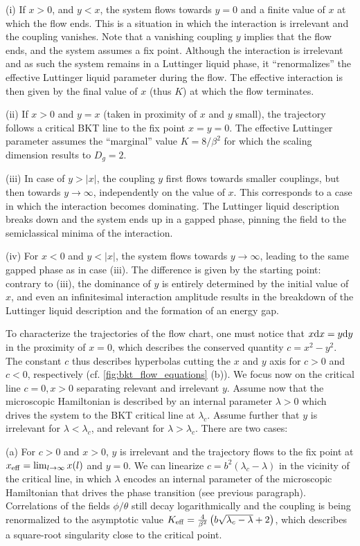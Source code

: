 (i) If $x>0$, and $y<x$, the system flows towards $y=0$ and a finite value of $x$ at which the flow ends.
This is a situation in which the interaction is irrelevant and the coupling vanishes.
Note that a vanishing coupling $y$ implies that the flow ends, and the system assumes a fix point.
Although the interaction is irrelevant and as such the system remains in a Luttinger liquid phase, it ``renormalizes'' the effective Luttinger liquid parameter during the flow.
The effective interaction is then given by the final value of $x$ (thus $K$) at which the flow terminates.

(ii) If $x>0$ and $y=x$ (taken in proximity of $x$ and $y$ small), the trajectory follows a critical BKT line to the fix point $x=y=0$.
The effective Luttinger parameter assumes the ``marginal'' value $K=8/\beta^2$ for which the scaling dimension results to $D_g=2$.

(iii) In case of $y>|x|$, the coupling $y$ first flows towards smaller couplings, but then towards $y\rightarrow\infty$, independently on the value of $x$.
This corresponds to a case in which the interaction becomes dominating.
The Luttinger liquid description breaks down and the system ends up in a gapped phase, pinning the field to the semiclassical minima of the interaction.

(iv) For $x<0$ and $y<|x|$, the system flows towards $y\rightarrow\infty$, leading to the same gapped phase as in case (iii).
The difference is given by the starting point: contrary to (iii), the dominance of $y$ is entirely determined by the initial value of $x$, and even an infinitesimal interaction amplitude results in the breakdown of the Luttinger liquid description and the formation of an energy gap.

To characterize the trajectories of the flow chart, one must notice that $x\mathrm d x = y\mathrm d y$ in the proximity of $x=0$, which describes the conserved quantity $c = x^2-y^2$.
The constant $c$ thus describes hyperbolas cutting the $x$ and $y$ axis for $c>0$ and $c<0$, respectively (cf. \cref{fig:bkt_flow_equations} (b)).
We focus now on the critical line $c=0, x>0$ separating relevant and irrelevant $y$.
Assume now that the microscopic Hamiltonian is described by an internal parameter $\lambda>0$ which drives the system to the BKT critical line at $\lambda_c$.
Assume further that $y$ is irrelevant for $\lambda<\lambda_c$, and relevant for $\lambda>\lambda_c$.
There are two cases:

(a) For $c>0$ and $x>0$, $y$ is irrelevant and the trajectory flows to the fix point at $x_{\rm eff} = \lim_{l\rightarrow\infty} x(l)$ and $y=0$.
We can linearize $c=b^2(\lambda_c-\lambda)$ in the vicinity of the critical line, in which $\lambda$ encodes an internal parameter of the microscopic Hamiltonian that drives the phase transition (see previous paragraph).
Correlations of the fields $\phi/\theta$ still decay logarithmically and the coupling is being renormalized to the asymptotic value $K_{\rm eff} = \frac4{\beta^2}\left( b\sqrt{\lambda_c-\lambda}+2 \right)$, which describes a square-root singularity close to the critical point.

